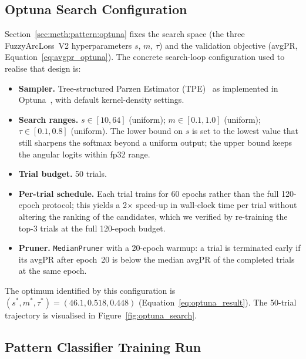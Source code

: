 \subsection{Optuna Search Configuration}
\label{sec:impl:pattern:optuna_config}

Section~\ref{sec:meth:pattern:optuna} fixes the search space (the
three FuzzyArcLoss~V2 hyperparameters $s$, $m$, $\tau$) and the
validation objective (avgPR, Equation~\ref{eq:avgpr_optuna}).
The concrete search-loop configuration used to realise that design is:
\begin{itemize}
    \item \textbf{Sampler.} Tree-structured Parzen Estimator
    (TPE)~\cite{bergstra2011tpe} as implemented in
    Optuna~\cite{akiba2019optuna}, with default kernel-density
    settings.
    \item \textbf{Search ranges.}
    $s \in [10, 64]$ (uniform); $m \in [0.1, 1.0]$ (uniform);
    $\tau \in [0.1, 0.8]$ (uniform).
    The lower bound on $s$ is set to the lowest value that still
    sharpens the softmax beyond a uniform output; the upper bound
    keeps the angular logits within fp32 range.
    \item \textbf{Trial budget.} 50 trials.
    \item \textbf{Per-trial schedule.} Each trial trains for 60 epochs
    rather than the full 120-epoch protocol; this yields a 2$\times$
    speed-up in wall-clock time per trial without altering the
    ranking of the candidates, which we verified by re-training the
    top-3 trials at the full 120-epoch budget.
    \item \textbf{Pruner.} \texttt{MedianPruner} with a 20-epoch
    warmup: a trial is terminated early if its avgPR after epoch~20
    is below the median avgPR of the completed trials at the same
    epoch.
\end{itemize}
The optimum identified by this configuration is
$(s^*, m^*, \tau^*) = (46.1, 0.518, 0.448)$
(Equation~\ref{eq:optuna_result}).
The 50-trial trajectory is visualised in
Figure~\ref{fig:optuna_search}.

\subsection{Pattern Classifier Training Run}
\label{sec:impl:pattern:training_protocol}

